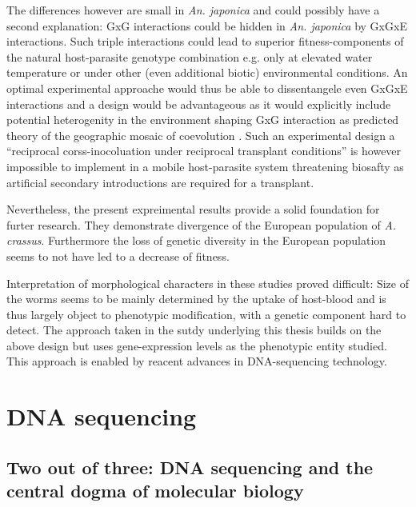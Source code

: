 The differences however are small in \textit{An. japonica} and could
possibly have a second explanation: GxG interactions could be hidden
in \textit{An. japonica} by GxGxE interactions. Such triple
interactions could lead to superior fitness-components of the natural
host-parasite genotype combination e.g. only at elevated water
temperature or under other (even additional biotic) environmental
conditions. An optimal experimental approache would thus be able to
dissentangele even GxGxE interactions and a design would be
advantageous as it would explicitly include potential heterogenity in
the environment shaping GxG interaction as predicted theory of the
geographic mosaic of coevolution \cite{thompson2005geographic}. Such
an experimental design a ``reciprocal corss-inocoluation under
reciprocal transplant conditions'' \cite{pmid18419564} is however
impossible to implement in a mobile host-parasite system threatening
biosafty as artificial secondary introductions are required for a
transplant.

Nevertheless, the present expreimental results provide a solid
foundation for furter research. They demonstrate divergence of the
European population of \textit{A. crassus}. Furthermore the loss of
genetic diversity in the European population
\cite{wielgoss_population_2008} seems to not have led to a decrease of
fitness.

Interpretation of morphological characters in these studies proved
difficult: Size of the worms seems to be mainly determined by the
uptake of host-blood and is thus largely object to phenotypic
modification, with a genetic component hard to detect. The approach
taken in the sutdy underlying this thesis builds on the above design
but uses gene-expression levels as the phenotypic entity studied. This
approach is enabled by reacent advances in DNA-sequencing technology.

\section{DNA sequencing}


\subsection{Two out of three: DNA sequencing and the central dogma of
  molecular biology}
\label{sec:dm}



